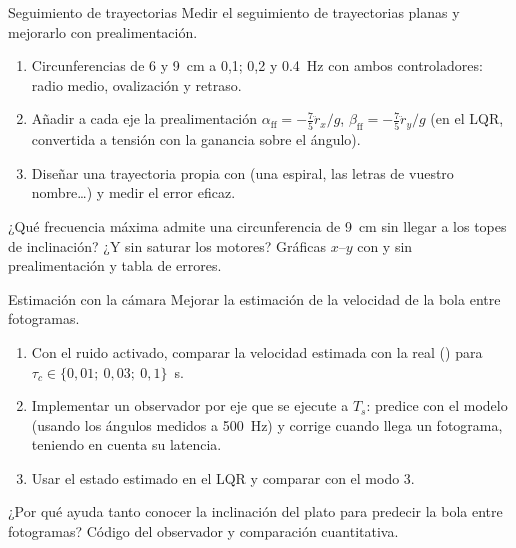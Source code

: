 \label{pr:tray}
\begin{practica}{Seguimiento de trayectorias}
\objetivos Medir el seguimiento de trayectorias planas y mejorarlo con prealimentación.
\procedimiento
\begin{enumerate}
  \item Circunferencias de 6 y \SI{9}{cm} a 0,1; 0,2 y \SI{0.4}{Hz} con ambos controladores: radio medio, ovalización y retraso.
  \item Añadir a cada eje la prealimentación $\alpha_{\text{ff}}=-\tfrac75\ddot r_x/g$, $\beta_{\text{ff}}=-\tfrac75\ddot r_y/g$ (en el LQR, convertida a tensión con la ganancia sobre el ángulo).
  \item Diseñar una trayectoria propia con  (una espiral, las letras de vuestro nombre\ldots) y medir el error eficaz.
\end{enumerate}
\preguntas ¿Qué frecuencia máxima admite una circunferencia de \SI{9}{cm} sin llegar a los topes de inclinación? ¿Y sin saturar los motores?
\entregables Gráficas $x$--$y$ con y sin prealimentación y tabla de errores.
\end{practica}

\label{pr:obs}
\begin{practica}{Estimación con la cámara}
\objetivos Mejorar la estimación de la velocidad de la bola entre fotogramas.
\procedimiento
\begin{enumerate}
  \item Con el ruido activado, comparar la velocidad estimada con la real () para $\tau_c\in\{0{,}01;\ 0{,}03;\ 0{,}1\}$~s.
  \item Implementar un observador por eje que se ejecute a $T_s$: predice con el modelo (usando los ángulos medidos a \SI{500}{Hz}) y corrige cuando llega un fotograma, teniendo en cuenta su latencia.
  \item Usar el estado estimado en el LQR y comparar con el modo 3.
\end{enumerate}
\preguntas ¿Por qué ayuda tanto conocer la inclinación del plato para predecir la bola entre fotogramas?
\entregables Código del observador y comparación cuantitativa.
\end{practica}
